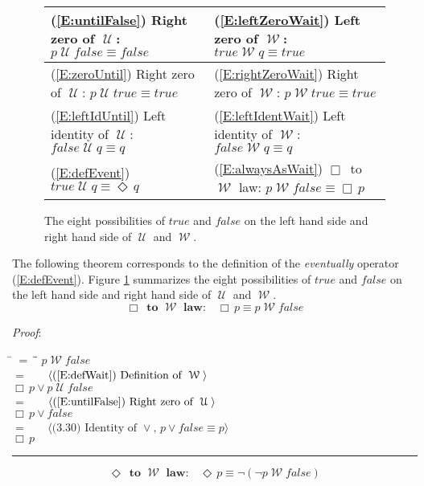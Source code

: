 \documentclass[12pt, fleqn, leqno]{article}
\newcommand{\lgap}{2pt}                             %
\newcommand{\mymathindent}{24pt}                    %
\newcommand{\Until}{\;\mathcal{U}\;}
\newcommand{\Wait}{\;\mathcal{W}\;}
\newcommand{\Event}{\Diamond\,}
\newcommand{\Always}{\Box\,}
\newcommand{\myqed}{\rule[-.23ex]{1.2ex}{2.0ex}}
\newcommand{\myqedtab}{\hspace{384pt}}              %
\newcommand{\Gll} {\langle}                         %
\newcommand{\Ggg} {\rangle}                         %
\newcommand{\Hint}[1]     {\ \ \ $\Gll              \mbox{#1} \Ggg$ }   %
\begin{document}
\begin{figure}[t]
\centering
\renewcommand\arraystretch{1.2}
\begin{tabular}{ l l }
  \toprule
  (\ref{E:untilFalse}) Right zero of $\Until$:\; $p \Until false \equiv false$
  &
  (\ref{E:leftZeroWait}) Left zero of $\Wait$:\; $true \Wait q \equiv true$ \\
  \midrule
  (\ref{E:zeroUntil}) Right zero of $\Until$:\; $p \Until true \equiv true$
  &
  (\ref{E:rightZeroWait}) Right zero of $\Wait$:\; $p \Wait true \equiv true$ \\
  \midrule
  (\ref{E:leftIdUntil}) Left identity of $\Until$:\; $false \Until q \equiv q$
  &
  (\ref{E:leftIdentWait}) Left identity of $\Wait$:\; $false \Wait q \equiv q$ \\
  \midrule
  (\ref{E:defEvent}) $true \Until q \equiv \Event q$
  &
  (\ref{E:alwaysAsWait}) $\Always$ to $\Wait$ law:\; $p \Wait false\equiv \Always p$ \\
  \bottomrule
\end{tabular}
\renewcommand\arraystretch{1}
\caption{The eight possibilities of $true$ and $false$ on the left hand side and right hand side of $\Until$ and $\Wait$.
\label{true-false-wait-until}}
\end{figure}

The following theorem corresponds to the definition of the \textit{eventually} operator (\ref{E:defEvent}).
Figure \ref{true-false-wait-until} summarizes the eight possibilities of $true$ and $false$ on the left hand side and right hand side of $\Until$ and $\Wait$.
\begin{equation}\label{E:alwaysAsWait}
\textbf{$\Always$ to $\Wait$ law:}\quad \Always p \equiv p \Wait false
\end{equation}

\emph{Proof}:
\begin{tabbing}
\hspace{\mymathindent} \= $= \;$ \= \myqedtab \= \kill
\> \> $p \Wait false$\\[\lgap]
\> $=$ \> \Hint{(\ref{E:defWait}) Definition of $\Wait$} \\[\lgap]
\> \> $\Always p\lor p \Until false$\\[\lgap]
\> $=$ \> \Hint{(\ref{E:untilFalse}) Right zero of $\Until$} \\[\lgap]
\> \> $\Always p\lor false$\\[\lgap]
\> $=$ \> \Hint{(3.30) Identity of $\lor$, $p\lor false\equiv p$} \\[\lgap]
\> \> $\Always p$ \quad \myqed
\end{tabbing}
\begin{equation}\label{E:eventAsWait}
\textbf{$\Event$ to $\Wait$ law:}\quad \Event p \equiv \neg(\neg p \Wait false)
\end{equation}
\end{document}
